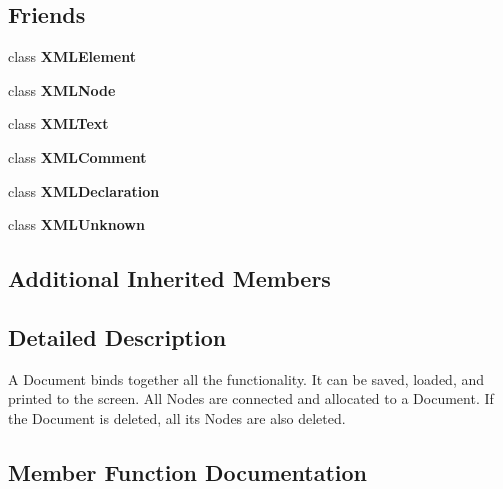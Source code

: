 \subsection*{Friends}
\begin{DoxyCompactItemize}
\item 
\mbox{\label{classCPlantBox_1_1tinyxml2_1_1XMLDocument_ac2fba9b6e452829dd892f7392c24e0eb}} 
class {\bfseries X\+M\+L\+Element}
\item 
\mbox{\label{classCPlantBox_1_1tinyxml2_1_1XMLDocument_a8233f9dc4d61d90e93be2a3647c6d957}} 
class {\bfseries X\+M\+L\+Node}
\item 
\mbox{\label{classCPlantBox_1_1tinyxml2_1_1XMLDocument_ae50b59416e98bbe7e4bc87df40092109}} 
class {\bfseries X\+M\+L\+Text}
\item 
\mbox{\label{classCPlantBox_1_1tinyxml2_1_1XMLDocument_acee9e261162d4236fb2c30312c54cd4c}} 
class {\bfseries X\+M\+L\+Comment}
\item 
\mbox{\label{classCPlantBox_1_1tinyxml2_1_1XMLDocument_a93d2c2c2db3973083b7d6e7f6f358160}} 
class {\bfseries X\+M\+L\+Declaration}
\item 
\mbox{\label{classCPlantBox_1_1tinyxml2_1_1XMLDocument_a6946948274f7a02f5e69b5dbeaea9b35}} 
class {\bfseries X\+M\+L\+Unknown}
\end{DoxyCompactItemize}
\subsection*{Additional Inherited Members}


\subsection{Detailed Description}
A Document binds together all the functionality. It can be saved, loaded, and printed to the screen. All Nodes are connected and allocated to a Document. If the Document is deleted, all its Nodes are also deleted. 

\subsection{Member Function Documentation}
\mbox{\label{classCPlantBox_1_1tinyxml2_1_1XMLDocument_acca54ff6fe186645813bc5ce00326653}} 
